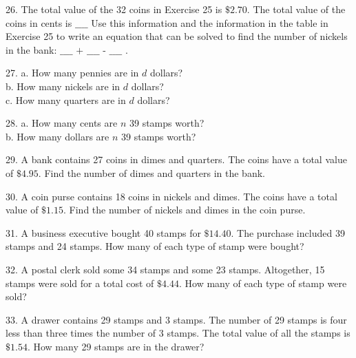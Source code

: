 \documentclass{ximera}
\begin{document}
\begin{exercise}
26. The total value of the 32 coins in Exercise 25 is $\$ 2.70$. The total value of the coins in cents is $\_\_\_\_$ Use this information and the information in the table in Exercise 25 to write an equation that can be solved to find the number of nickels in the bank: $\_\_\_\_$ $+$ $\_\_\_\_$ - $\_\_\_\_$ .
\end{exercise}

\begin{exercise}
27. a. How many pennies are in $d$ dollars?\\
b. How many nickels are in $d$ dollars?\\
c. How many quarters are in $d$ dollars?
\end{exercise}

\begin{exercise}
28. a. How many cents are $n$ 39\textcent{} stamps worth?\\
b. How many dollars are $n$ 39\textcent{} stamps worth?
\end{exercise}

\begin{exercise}
29. A bank contains 27 coins in dimes and quarters. The coins have a total value of $\$ 4.95$. Find the number of dimes and quarters in the bank.
\end{exercise}

\begin{exercise}
30. A coin purse contains 18 coins in nickels and dimes. The coins have a total value of $\$ 1.15$. Find the number of nickels and dimes in the coin purse.
\end{exercise}

\begin{exercise}
31. A business executive bought 40 stamps for $\$ 14.40$. The purchase included 39\textcent{} stamps and 24\textcent{} stamps. How many of each type of stamp were bought?
\end{exercise}

\begin{exercise}
32. A postal clerk sold some 34\textcent{} stamps and some 23\textcent{} stamps. Altogether, 15 stamps were sold for a total cost of $\$ 4.44$. How many of each type of stamp were sold?
\end{exercise}

\begin{exercise}
33. A drawer contains 29\textcent{} stamps and 3\textcent{} stamps. The number of 29\textcent{} stamps is four less than three times the number of 3\textcent{} stamps. The total value of all the stamps is $\$ 1.54$. How many 29\textcent{} stamps are in the drawer?
\end{exercise}
\end{document}
